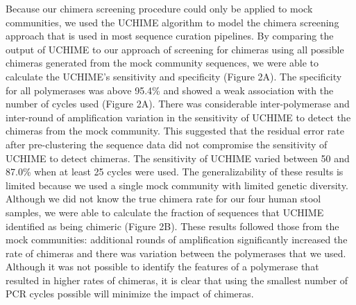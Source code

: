\documentclass[11pt,]{article}
\begin{document}
Because our chimera screening procedure could only be applied to mock
communities, we used the UCHIME algorithm to model the chimera screening
approach that is used in most sequence curation pipelines. By comparing
the output of UCHIME to our approach of screening for chimeras using all
possible chimeras generated from the mock community sequences, we were
able to calculate the UCHIME's sensitivity and specificity (Figure 2A).
The specificity for all polymerases was above 95.4\% and showed a weak
association with the number of cycles used (Figure 2A). There was
considerable inter-polymerase and inter-round of amplification variation
in the sensitivity of UCHIME to detect the chimeras from the mock
community. This suggested that the residual error rate after
pre-clustering the sequence data did not compromise the sensitivity of
UCHIME to detect chimeras. The sensitivity of UCHIME varied between 50
and 87.0\% when at least 25 cycles were used. The generalizability of
these results is limited because we used a single mock community with
limited genetic diversity. Although we did not know the true chimera
rate for our four human stool samples, we were able to calculate the
fraction of sequences that UCHIME identified as being chimeric (Figure
2B). These results followed those from the mock communities: additional
rounds of amplification significantly increased the rate of chimeras and
there was variation between the polymerases that we used. Although it
was not possible to identify the features of a polymerase that resulted
in higher rates of chimeras, it is clear that using the smallest number
of PCR cycles possible will minimize the impact of chimeras.
\end{document}
